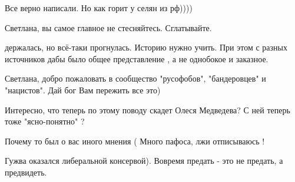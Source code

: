 \begin{itemize}
Все верно написали.
Но как горит у селян из рф))))

 
Светлана, вы самое главное не стесняйтесь. Сглатывайте.

 
держалась, но всё-таки прогнулась. Историю нужно учить. При этом с разных
источников дабы было общее представление , а не однобокое и заказное.

 
Светлана, добро пожаловать в сообщество "русофобов", "бандеровцев" и "нацистов". Дай бог Вам пережить все это)

 
Интересно, что теперь по этому поводу скадет Олеся Медведева? С ней теперь тоже "ясно-понятно" ?

 
Почему то был о вас иного мнения (
Много пафоса, лжи отписываюсь !

 
Гужва оказался либеральной консервой).
Вовремя предать - это не предать, а предвидеть.

 

\end{itemize}
